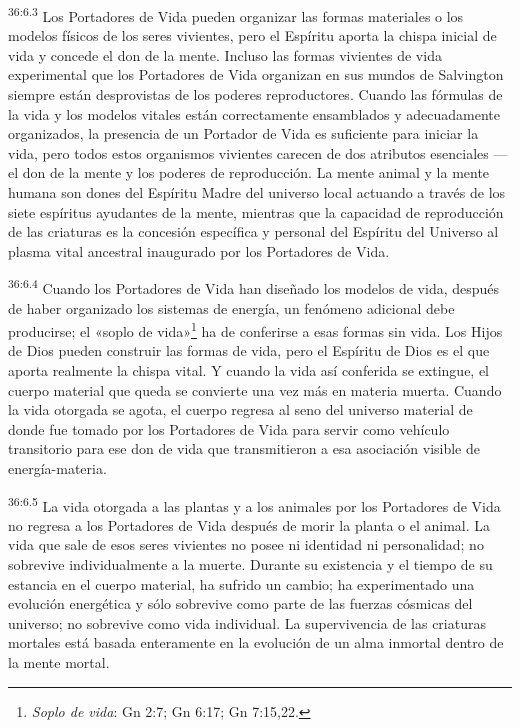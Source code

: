 \par
\textsuperscript{36:6.3} Los Portadores de Vida pueden organizar las formas materiales o los modelos físicos de los seres vivientes, pero el Espíritu aporta la chispa inicial de vida y concede el don de la mente. Incluso las formas vivientes de vida experimental que los Portadores de Vida organizan en sus mundos de Salvington siempre están desprovistas de los poderes reproductores. Cuando las fórmulas de la vida y los modelos vitales están correctamente ensamblados y adecuadamente organizados, la presencia de un Portador de Vida es suficiente para iniciar la vida, pero todos estos organismos vivientes carecen de dos atributos esenciales ---el don de la mente y los poderes de reproducción. La mente animal y la mente humana son dones del Espíritu Madre del universo local actuando a través de los siete espíritus ayudantes de la mente, mientras que la capacidad de reproducción de las criaturas es la concesión específica y personal del Espíritu del Universo al plasma vital ancestral inaugurado por los Portadores de Vida.

\par
\textsuperscript{36:6.4} Cuando los Portadores de Vida han diseñado los modelos de vida, después de haber organizado los sistemas de energía, un fenómeno adicional debe producirse; el «soplo de vida»\footnote{\textit{Soplo de vida}: Gn 2:7; Gn 6:17; Gn 7:15,22.} ha de conferirse a esas formas sin vida. Los Hijos de Dios pueden construir las formas de vida, pero el Espíritu de Dios es el que aporta realmente la chispa vital. Y cuando la vida así conferida se extingue, el cuerpo material que queda se convierte una vez más en materia muerta. Cuando la vida otorgada se agota, el cuerpo regresa al seno del universo material de donde fue tomado por los Portadores de Vida para servir como vehículo transitorio para ese don de vida que transmitieron a esa asociación visible de energía-materia.

\par
\textsuperscript{36:6.5} La vida otorgada a las plantas y a los animales por los Portadores de Vida no regresa a los Portadores de Vida después de morir la planta o el animal. La vida que sale de esos seres vivientes no posee ni identidad ni personalidad; no sobrevive individualmente a la muerte. Durante su existencia y el tiempo de su estancia en el cuerpo material, ha sufrido un cambio; ha experimentado una evolución energética y sólo sobrevive como parte de las fuerzas cósmicas del universo; no sobrevive como vida individual. La supervivencia de las criaturas mortales está basada enteramente en la evolución de un alma inmortal dentro de la mente mortal.

